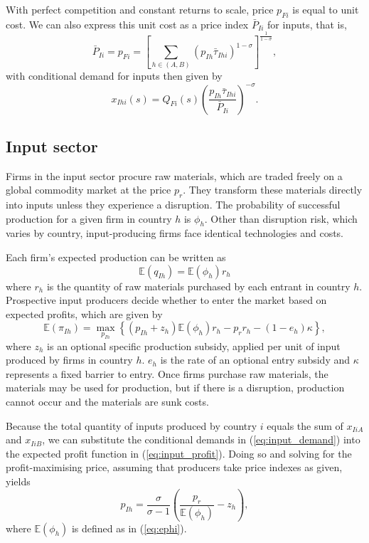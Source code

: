 \documentclass{article}
\begin{document}
With perfect competition and constant returns to scale, price $p_{Fi}$ is equal to unit cost. We can also express this unit cost as a price index $\bar{P}_{Ii}$ for inputs, that is,
\begin{equation*}
    \bar{P}_{Ii} = p_{Fi} = \left[ \sum_{h\in(A,B)} ( p_{Ih} \bar{\tau}_{Ihi} )^{1 - \sigma} \right]^{\frac{1}{1 - \sigma}},
\end{equation*}
with conditional demand for inputs then given by
\begin{equation} \label{eq:input_demand}
    x_{Ihi}(s) = Q_{Fi}(s) \left( \frac{p_{Ih} \bar{\tau}_{Ihi}}{\bar{P}_{Ii}} \right)^{-\sigma}.
\end{equation}

\subsection{Input sector}

Firms in the input sector procure raw materials, which are traded freely on a global commodity market at the price $p_r$. They transform these materials directly into inputs unless they experience a disruption. The probability of successful production for a given firm in country $h$ is $\phi_{h}$. Other than disruption risk, which varies by country, input-producing firms face identical technologies and costs.

Each firm's expected production can be written as
\begin{equation*}
    \mathbb{E} (q_{Ih}) = \mathbb{E} ( \phi_{h} ) r_h
\end{equation*}
where $r_h$ is the quantity of raw materials purchased by each entrant in country $h$. Prospective input producers decide whether to enter the market based on expected profits, which are given by
\begin{equation} \label{eq:input_profit}
    \mathbb{E} (\pi_{Ih}) = \max_{p_{Ih}} \left\{ \left(p_{Ih} + z_h \right) \mathbb{E}(\phi_h) r_h - p_r r_h - (1 - e_h) \kappa \right\},
\end{equation}
where $z_h$ is an optional specific production subsidy, applied per unit of input produced by firms in country $h$. $e_h$ is the rate of an optional entry subsidy and $\kappa$ represents a fixed barrier to entry. Once firms purchase raw materials, the materials may be used for production, but if there is a disruption, production cannot occur and the materials are sunk costs.

Because the total quantity of inputs produced by country $i$ equals the sum of $x_{IiA}$ and $x_{IiB}$, we can substitute the conditional demands in (\ref{eq:input_demand}) into the expected profit function in (\ref{eq:input_profit}). Doing so and solving for the profit-maximising price, assuming that producers take price indexes as given, yields
\begin{equation*}
    p_{Ih} = \frac{\sigma}{\sigma - 1} \left( \frac{p_r}{\mathbb{E}(\phi_h)} - z_h \right),
\end{equation*}
where $\mathbb{E}(\phi_h)$ is defined as in (\ref{eq:ephi}).
\end{document}
